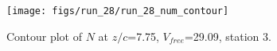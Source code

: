 \begin{figure}[H]
\centering
\texttt{[image: figs/run\_28/run\_28\_num\_contour]}
\caption{Contour plot of $N$ at $z/c$=7.75, $V_{free}$=29.09, station 3.}
\label{fig:run_28_num_contour}
\end{figure}


